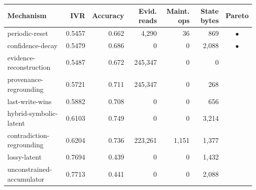 \begin{tabular}{lrrrrrc}
\toprule
Mechanism & IVR & Accuracy & Evid. reads & Maint. ops & State bytes & Pareto \\
\midrule
periodic-reset & 0.5457 & 0.662 & 4,290 & 36 & 869 & $\bullet$ \\
confidence-decay & 0.5479 & 0.686 & 0 & 0 & 2,088 & $\bullet$ \\
evidence-reconstruction & 0.5487 & 0.672 & 245,347 & 0 & 0 &  \\
provenance-regrounding & 0.5721 & 0.711 & 245,347 & 0 & 268 &  \\
last-write-wins & 0.5882 & 0.708 & 0 & 0 & 656 &  \\
hybrid-symbolic-latent & 0.6103 & 0.749 & 0 & 0 & 3,214 &  \\
contradiction-regrounding & 0.6204 & 0.736 & 223,261 & 1,151 & 1,377 &  \\
lossy-latent & 0.7694 & 0.439 & 0 & 0 & 1,432 &  \\
unconstrained-accumulator & 0.7713 & 0.441 & 0 & 0 & 2,088 &  \\
\bottomrule
\end{tabular}